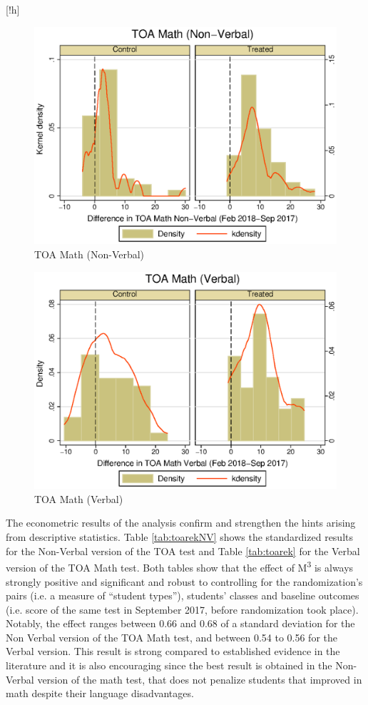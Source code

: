 \documentclass[ 12 pt]{article}
\makeatletter
\renewenvironment{figure}%
{\renewcommand\familydefault\sfdefault
	\@float{figure}}
{\end@float}
\makeatother
\begin{document}
\begin{figure}[!h]
\caption{Distribution of differences in TOA scores (September vs February)}
\begin{subfigure}{.5\textwidth}
  \centering
	\includegraphics[width=.8\linewidth]{HIST_MATH_NON_VERB.eps}
  \caption{TOA Math (Non-Verbal)}
  \label{fig:histNV}
\end{subfigure}%
\begin{subfigure}{.5\textwidth}
  \centering
  \includegraphics[width=.8\linewidth]{HIST_MATH_VERB.eps}
  \caption{TOA Math (Verbal)}
	\label{fig:histVERB}
\end{subfigure}
\label{fig:hists}
\end{figure}



The econometric results of the analysis confirm and strengthen the hints arising from descriptive statistics. 
Table \ref{tab:toarekNV} shows the standardized results for the Non-Verbal version of the TOA test and Table \ref{tab:toarek} for the Verbal version of the TOA Math test. Both tables show that the effect of M\textsuperscript{3} is always strongly positive and significant and robust to controlling for the randomization's pairs (i.e. a measure of \enquote{student types}), students' classes and baseline outcomes (i.e. score of the same test in September 2017, before randomization took place). Notably, the effect ranges between 0.66 and 0.68 of a standard deviation for the Non Verbal version of the TOA Math test, and between 0.54 to 0.56 for the Verbal version. This result is strong compared to established evidence in the literature and it is also encouraging since the best result is obtained in the Non-Verbal version of the math test, that does not penalize students that improved in math despite their language disadvantages.
\end{document}
